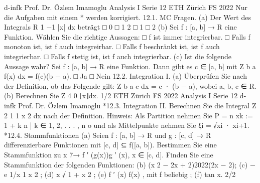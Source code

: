 d-infk
Prof. Dr. Özlem Imamoglu
Analysis I
Serie 12
ETH Zürich
FS 2022
Nur die Aufgaben mit einem * werden korrigiert.
12.1. MC Fragen.
(a) Der Wert des Integrals R 1
−1
|x| dx beträgt
□ 0
□
1
2
□ 1
□ 2
(b) Sei f : [a, b] → R eine Funktion. Wählen Sie die richtige Aussagen:
□ f ist immer integrierbar.
□ Falls f monoton ist, ist f auch integreirbar.
□ Falls f beschränkt ist, ist f auch integrierbar.
□ Falls f stetig ist, ist f auch integrierbar.
(c) Ist die folgende Aussage wahr?
Sei f : [a, b] → R eine Funktion. Dann gibt es c ∈ [a, b] mit
Z b
a
f(x) dx = f(c)(b − a).
□ Ja
□ Nein
12.2. Integration I.
(a) Überprüfen Sie nach der Definition, ob das Folgende gilt:
Z b
a
c dx = c · (b − a),
wobei a, b, c ∈ R.
(b) Berechnen Sie
Z 4
0
⌊x⌋dx.
1/2
ETH Zürich
FS 2022
Analysis I
Serie 12
d-infk
Prof. Dr. Özlem Imamoglu
*12.3. Integration II. Berechnen Sie die Integral
Z 2
1
1
x
2
dx
nach der Definition.
Hinweis: Als Partition nehmen Sie P =
n
xk
:= 1 + k
n
| k ∈ {1, 2, . . . , n}
o
und als
Mittelpunkte nehmen Sie ξi =
√xi
· xi+1.
*12.4. Stammfunktionen
(a) Seien f : [a, b] → R und g : [c, d] → R differenzierbare Funktionen mit [c, d] ⊆
f([a, b]). Bestimmen Sie eine Stammfunktion zu
x 7→ f
′
(g(x))g
′
(x), x ∈ [c, d].
Finden Sie eine Stammfunktion der folgenden Funktionen:
(b) (x
2 − 2x + 2)2022(2x − 2);
(c) − e
1/x 1
x
2
;
(d) x
√
1 + x
2
;
(e) f
′
(x)
f(x)
, mit f beliebig ;
(f) tan x.
2/2

